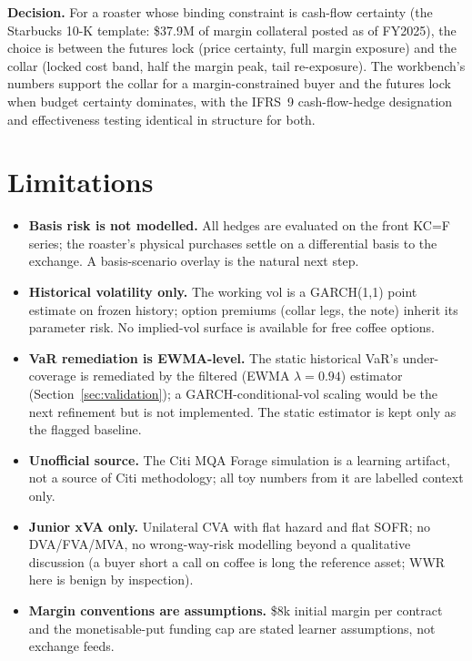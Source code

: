 \documentclass[11pt,a4paper]{article}
\newcommand{\usd}{\$}
\begin{document}
\textbf{Decision.} For a roaster whose binding constraint is cash-flow
certainty (the Starbucks 10-K template: \usd{}37.9M of margin collateral
posted as of FY2025), the choice is between the futures lock (price
certainty, full margin exposure) and the collar (locked cost band,
half the margin peak, tail re-exposure). The workbench's numbers support
the collar for a margin-constrained buyer and the futures lock when
budget certainty dominates, with the IFRS~9 cash-flow-hedge
designation and effectiveness testing identical in structure for both.

\section{Limitations}\label{sec:limitations}

\begin{itemize}
\item \textbf{Basis risk is not modelled.} All hedges are evaluated on the
front KC=F series; the roaster's physical purchases settle on a differential
basis to the exchange. A basis-scenario overlay is the natural next step.
\item \textbf{Historical volatility only.} The working vol is a GARCH(1,1)
point estimate on frozen history; option premiums (collar legs, the note)
inherit its parameter risk. No implied-vol surface is available for free
coffee options.
\item \textbf{VaR remediation is EWMA-level.} The static historical VaR's
under-coverage is remediated by the filtered (EWMA $\lambda=0.94$) estimator
(Section~\ref{sec:validation}); a GARCH-conditional-vol scaling would be
the next refinement but is not implemented. The static estimator is kept
only as the flagged baseline.
\item \textbf{Unofficial source.} The Citi MQA Forage simulation is a
learning artifact, not a source of Citi methodology; all toy numbers from
it are labelled context only.
\item \textbf{Junior xVA only.} Unilateral CVA with flat hazard and flat
SOFR; no DVA/FVA/MVA, no wrong-way-risk modelling beyond a qualitative
discussion (a buyer short a call on coffee is long the reference asset;
WWR here is benign by inspection).
\item \textbf{Margin conventions are assumptions.} \usd{}8k initial margin
per contract and the monetisable-put funding cap are stated learner
assumptions, not exchange feeds.
\end{itemize}
\end{document}
